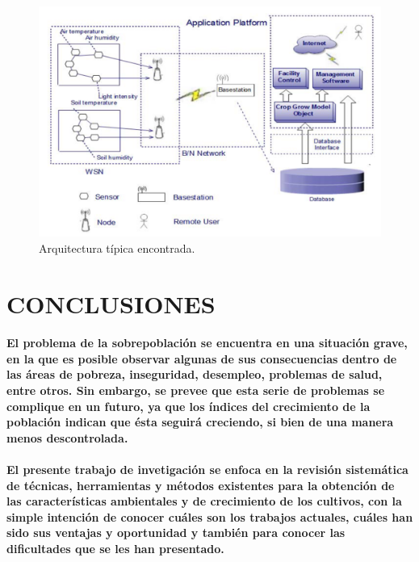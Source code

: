 \documentclass[10pt, twocolumn]{article}
\begin{document}
\begin{figure}[!ht]
	\centering
	\includegraphics[scale=0.5]{common_architecture.png}
	\caption{Arquitectura típica encontrada.}
\end{figure}

\section{CONCLUSIONES}
\paragraph{El problema de la sobrepoblación se encuentra en una situación grave, en la que es posible observar algunas de sus consecuencias dentro de las áreas de pobreza, inseguridad, desempleo, problemas de salud, entre otros. Sin embargo, se prevee que esta serie de problemas se complique en un futuro, ya que los índices del crecimiento de la población indican que ésta seguirá creciendo, si bien de una manera menos descontrolada.}
\paragraph{El presente trabajo de invetigación se enfoca en la revisión sistemática de técnicas, herramientas y métodos existentes para la obtención de las características ambientales y de crecimiento de los cultivos, con la simple intención de conocer cuáles son los trabajos actuales, cuáles han sido sus ventajas y oportunidad y también para conocer las dificultades que se les han presentado.}



\end{document}
